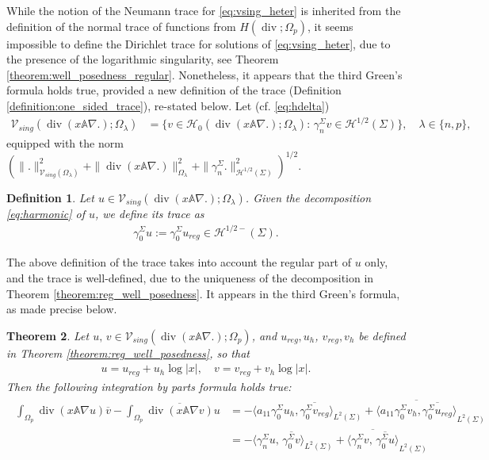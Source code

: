\documentclass[report]{elsarticle}
\newtheorem{theorem}{Theorem}[section]
\newtheorem{definition}[theorem]{Definition}
\numberwithin{theorem}{section}
\begin{document}
While the notion of the Neumann trace for \eqref{eq:vsing_heter} is inherited from the definition of the normal trace of functions from  ${H}(\operatorname{div};\Omega_p)$, it seems impossible to define the Dirichlet trace for solutions of \eqref{eq:vsing_heter}, due to the presence of the logarithmic singularity, see Theorem \ref{theorem:well_posedness_regular}. Nonetheless, it appears that the third Green's formula holds true, provided a new definition of the trace (Definition \ref{definition:one_sided_trace}), re-stated below. Let (cf. \eqref{eq:hdelta})
\begin{align*}
	\mathcal{V}_{sing}(\operatorname{div}(x\mathbb{A}\nabla.); \Omega_{\lambda})&=\{v\in \mathcal{H}_0(\operatorname{div}(x\mathbb{A}\nabla .); \Omega_{\lambda}): \, \gamma_n^{\Sigma}v\in \mathcal{H}^{1/2}(\Sigma)\},\quad \lambda\in\{n,p\}, 
\end{align*}
equipped with the norm $(\|.\|_{\mathcal{V}_{sing}(\Omega_{\lambda})}^2+\|\operatorname{div}(x\mathbb{A}\nabla .)\|_{\Omega_{\lambda}}^2+\|\gamma_n^{\Sigma}.\|_{\mathcal{H}^{1/2}(\Sigma)}^2)^{1/2}$.
\begin{definition}
	\label{def:trace}
	Let $u\in	\mathcal{V}_{sing}(\operatorname{div}(x\mathbb{A}\nabla.); \Omega_{\lambda})$. Given the decomposition \eqref{eq:harmonic} of $u$, we define its trace as 
	\begin{align*}
		\gamma_{0}^{\Sigma}u:=\gamma_{0}^{\Sigma}u_{reg}\in \mathcal{H}^{1/2-}(\Sigma).
	\end{align*}
\end{definition}
The above definition of the trace takes into account the regular part of $u$ only, and the trace is well-defined, due to the uniqueness of the decomposition in Theorem \ref{theorem:reg_well_posedness}. It appears in the third Green's formula, as made precise below.
\begin{theorem}
	\label{theorem:green}
	Let $u, \, v\in \mathcal{V}_{sing}(\operatorname{div}(x\mathbb{A}\nabla.); \Omega_{p})$, and  $u_{reg}, u_h$,  $v_{reg}, v_h$ be defined in Theorem \ref{theorem:reg_well_posedness}, so that 
	\begin{align*}
		u=u_{reg}+u_h\log|x|, \quad v=v_{reg}+v_h\log|x|.
	\end{align*}
	Then the following integration by parts formula holds true: 
	\begin{align}
		\label{eq:ibp}
		\begin{split}
			\int_{\Omega_p}\operatorname{div}( x  \mathbb{A}\nabla u)\overline{v}-\int_{\Omega_p}\overline{\operatorname{div}( x \mathbb{A}\nabla v)}{u}&=-\langle a_{11}\gamma_{0}^{\Sigma} u_h, \overline{\gamma_{0}^{\Sigma} v_{reg}}\rangle_{L^2(\Sigma)}+\overline{\langle a_{11}\gamma_{0}^{\Sigma} v_h, \overline{\gamma_{0}^{\Sigma} u_{reg}}\rangle}_{L^2(\Sigma)}\\
			&=-\langle \gamma_{n}^{\Sigma}u, \, \overline{\gamma_{0}^{\Sigma}v}\rangle_{L^2(\Sigma)} +\overline{\langle \gamma_{n}^{\Sigma}v, \, \overline{\gamma_{0}^{\Sigma}u}\rangle}_{L^2(\Sigma)}
		\end{split}
	\end{align}
\end{theorem}
\end{document}
